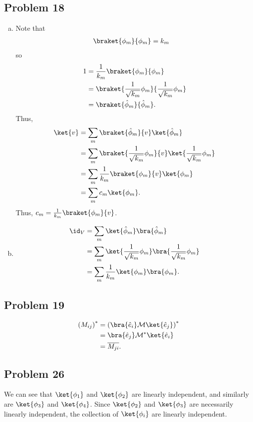 \documentclass[10pt]{mypackage}
\begin{document}
\subsection{Problem 18}%
\begin{enumerate}[(a)]
  \item Note that
    \begin{align*}
      \braket{\phi_m}{\phi_m} &= k_m
    \end{align*}
    so
    \begin{align*}
      1 &= \frac{1}{k_m}\braket{\phi_m}{\phi_m}\\
          &= \braket{\frac{1}{\sqrt{k_m}}\phi_m}{\frac{1}{\sqrt{k_m}}\phi_m}\\
                  &= \braket{\hat{\phi}_m}{\hat{\phi}_{m}}.
    \end{align*}
    Thus,
    \begin{align*}
      \ket{v} &= \sum_{m}\braket{\hat{\phi}_m}{v}\ket{\hat{\phi}_m}\\
              &= \sum_{m}\braket{\frac{1}{\sqrt{k_m}}\phi_m}{v}\ket{\frac{1}{\sqrt{k_m}}\phi_m}\\
              &= \sum_{m}\frac{1}{k_m}\braket{\phi_m}{v}\ket{\phi_m}\\
              &= \sum_{m}c_m\ket{\phi_m}.
    \end{align*}
    Thus, $c_m = \frac{1}{k_m}\braket{\phi_m}{v}$.
  \item 
    \begin{align*}
      \id_{V} &= \sum_{m}\ket{\hat{\phi}_m}\bra{\hat{\phi}_m}\\
              &= \sum_{m}\ket{\frac{1}{\sqrt{k_m}}\phi_m}\bra{\frac{1}{\sqrt{k_m}}\phi_m}\\
              &= \sum_{m}\frac{1}{k_m}\ket{\phi_m}\bra{\phi_m}.
    \end{align*}
\end{enumerate}
\subsection{Problem 19}%
\begin{align*}
  \left(M_{ij}\right)^{\ast} &= \left(\bra{\hat{e}_i}\mathcal{M}\ket{\hat{e}_j}\right)^{\ast}\\
                &= \bra{\hat{e}_j}\mathcal{M}^{\ast}\ket{\hat{e}_i}\\
                &= \overline{M_{ji}}.
\end{align*}
\subsection{Problem 26}%
We can see that $\ket{\phi_1}$ and $\ket{\phi_2}$ are linearly independent, and similarly are $\ket{\phi_3}$ and $\ket{\phi_4}$.  Since $\ket{\phi_2}$ and $\ket{\phi_3}$ are necessarily linearly independent, the collection of $\ket{\phi_i}$ are linearly independent.\newline
\end{document}
